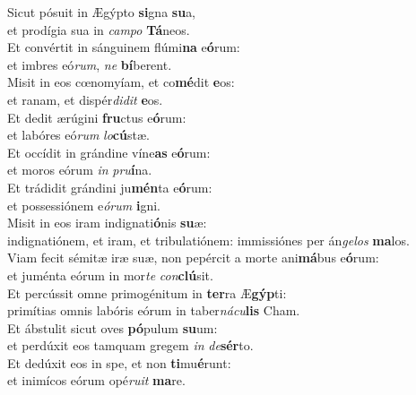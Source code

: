 \evenverse Sicut pósuit in Ægýpto \textbf{si}gna \textbf{su}a,~\*\\
\evenverse et prodígia sua in \textit{cam}\textit{po} \textbf{Tá}neos.\\
\oddverse Et convértit in sánguinem flúmi\textbf{na} e\textbf{ó}rum:~\*\\
\oddverse et imbres eó\textit{rum}, \textit{ne} \textbf{bí}berent.\\
\evenverse Misit in eos cœnomyíam, et co\textbf{mé}dit \textbf{e}os:~\*\\
\evenverse et ranam, et dispér\textit{di}\textit{dit} \textbf{e}os.\\
\oddverse Et dedit ærúgini \textbf{fru}ctus e\textbf{ó}rum:~\*\\
\oddverse et labóres eó\textit{rum} \textit{lo}\textbf{cú}stæ.\\
\evenverse Et occídit in grándine víne\textbf{as} e\textbf{ó}rum:~\*\\
\evenverse et moros eórum \textit{in} \textit{pru}\textbf{í}na.\\
\oddverse Et trádidit grándini ju\textbf{mén}ta e\textbf{ó}rum:~\*\\
\oddverse et possessiónem e\textit{ó}\textit{rum} \textbf{i}gni.\\
\evenverse Misit in eos iram indignati\textbf{ó}nis \textbf{su}æ:~\*\\
\evenverse indignatiónem, et iram, et tribulatiónem: immissiónes per án\textit{ge}\textit{los} \textbf{ma}los.\\
\oddverse Viam fecit sémitæ iræ suæ, non pepércit a morte ani\textbf{má}bus e\textbf{ó}rum:~\*\\
\oddverse et juménta eórum in mor\textit{te} \textit{con}\textbf{clú}sit.\\
\evenverse Et percússit omne primogénitum in \textbf{ter}ra Æ\textbf{gýp}ti:~\*\\
\evenverse primítias omnis labóris eórum in taber\textit{ná}\textit{cu}\textbf{lis} Cham.\\
\oddverse Et ábstulit sicut oves \textbf{pó}pulum \textbf{su}um:~\*\\
\oddverse et perdúxit eos tamquam gregem \textit{in} \textit{de}\textbf{sér}to.\\
\evenverse Et dedúxit eos in spe, et non \textbf{ti}mu\textbf{é}runt:~\*\\
\evenverse et inimícos eórum opé\textit{ru}\textit{it} \textbf{ma}re.\\
